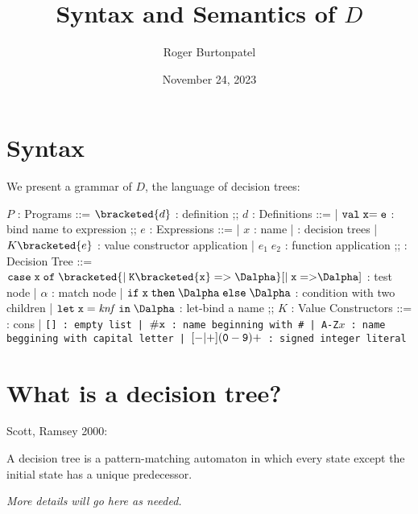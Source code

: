 \documentclass{article}
\title{Syntax and Semantics of $D$}
\author{Roger Burtonpatel}
\date{November 24, 2023}
\begin{document}
\maketitle

\section{Syntax}

We present a grammar of $D$, the language of decision trees: 


\begin{center}
  \begin{bnf}
    $P$ : \textsf{Programs} ::=
    $\bracketed{d}$ : definition
    ;;
    $d$ : \textsf{Definitions} ::=
    | $\tt{val} \; x  \tt{=} \; e$ : bind name to expression
    ;;
    $e$ : \textsf{Expressions} ::=
    | $x$ : name
    | \Dalpha : decision trees 
    | $K \bracketed{e}$ : value constructor application 
    | $e_1 \; e_2$ : function application 
    ;;
    \Dalpha : \textsf{Decision Tree} ::= 
    $\tt{case} \; x \; \tt{of} \; 
    \bracketed{\vert \; K\bracketed{x} \; \tt{=>} \; \Dalpha}
    [\vert \; x \; \tt{=>} \Dalpha]$ : test node 
    | $\alpha$ : match node 
    | $\tt{if} \; x \; \tt{then} \; \Dalpha \; \tt{else} \; \Dalpha$ : condition with two children 
    | $\tt{let} \; x \; \tt{=} \; \mathit{knf} \; \tt{in} \; \Dalpha$ : let-bind a name
    ;;
    $K$ : \textsf{Value Constructors} ::=
    \cons : cons 
    | \tt{[]} : empty list 
    | $\tt{\#}x$ : name beginning with \tt{\#}
    | \tt{A-Z}$x$ : name beggining with capital letter
    | $[\tt{-}\vert\tt{+}](\tt{0}-\tt{9})+$ : signed integer literal 
  \end{bnf}
\end{center}

\section{What is a decision tree?}
Scott, Ramsey 2000: 

A decision tree is a pattern-matching automaton in which every state except the
initial state has a unique predecessor. 

\bigskip

\it{More details will go here as needed.}


\end{document}
